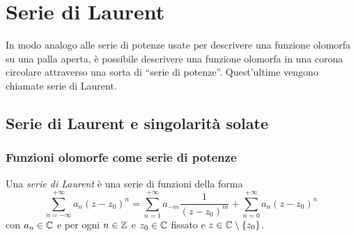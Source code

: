 \chapter{Serie di Laurent}

In modo analogo alle serie di potenze usate per descrivere una funzione olomorfa su una palla aperta, è possibile descrivere una funzione olomorfa in una corona circolare attraverso una sorta di ``serie di potenze''. Quest'ultime vengono chiamate serie di Laurent. 

\newpage
\section{Serie di Laurent e singolarità solate}
\subsection{\textcolor{AnComp}{\textbf{Funzioni olomorfe come serie di potenze}}}

\begin{definition}
  Una \emph{serie di Laurent} è una serie di funzioni della forma 
  \begin{equation*}
    \sum_{n=-\infty}^{+\infty} a_n(z-z_0)^n = \sum_{n=1}^{+\infty} a_{-m}
            \frac{1}{(z-z_0)^m} + \sum_{n=0}^{+\infty} a_n(z - z_0)^{n}
  \end{equation*}
con $a_n \in \mathbb{C}$ e per ogni $n \in \mathbb{Z}$ e $z_0 \in \mathbb{C}$ fissato e $z\in \mathbb{C}
\setminus \left\{ z_0 \right\}$.
  \label{def:serie_laurent}
\end{definition}


